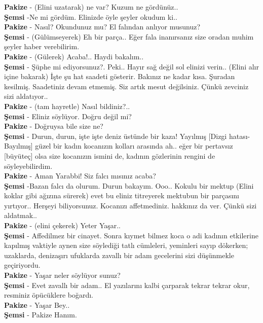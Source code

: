 \documentclass[]{book}
\begin{document}
\textbf{Pakize} - (Elini uzatarak) ne var? Kuzum ne gördünüz..\\
\textbf{Şemsi} -Ne mi gördüm. Elinizde öyle şeyler okudum ki..\\
\textbf{Pakize} - Nasıl? Okundunuz mu? El falından anlıyor musunuz?\\
\textbf{Şemsi} - (Gülümseyerek) Eh bir parça.. Eğer fala inanırsanız size oradan muhim şeyler haber verebilirim.\\
\textbf{Pakize} - (Gülerek) Acaba!.. Haydi bakalım..\\
\textbf{Şemsi} - Şüphe mi ediyorsunuz?. Peki.. Hayır sağ değil sol elinizi verin.. (Elini alır içine bakarak) İşte şu hat saadeti gösterir. Bakınız ne kadar kısa. Şuradan kesilmiş. Saadetiniz devam etmemiş. Siz artık mesut değilsiniz. Çünkü zevciniz sizi aldatıyor..\\
\textbf{Pakize} - (tam hayretle) Nasıl bildiniz?..\\
\textbf{Şemsi} - Eliniz söylüyor. Doğru değil mi?\\
\textbf{Pakize} - Doğruysa bile size ne?\\
\textbf{Şemsi} - Durun, durun, işte işte deniz üstünde bir kaza! Yayılmış {[}Dizgi hatası-Bayılmış{]} güzel bir kadın kocanızın kolları arasında ah.. eğer bir pertavsız {[}büyüteç{]} olsa size kocanızın ismini de, kadının gözlerinin rengini de söyleyebilirdim.\\
\textbf{Pakize} - Aman Yarabbi! Siz falcı mısınız acaba?\\
\textbf{Şemsi} -Bazan falcı da olurum. Durun bakayım. Ooo.. Kokulu bir mektup (Elini koklar gibi ağızına sürerek) evet bu eliniz titreyerek mektubun bir parçasını yırtıyor.. Herşeyi biliyorsunuz. Kocanızı affetmediniz. hakkınız da ver. Çünkü sizi aldatmak..\\
\textbf{Pakize} - (elini çekerek) Yeter Yaşar..\\
\textbf{Şemsi} - Affedilmez bir cinayet. Sonra kıymet bilmez koca o adi kadının etkilerine kapılmış vaktiyle aynen size söylediği tatlı cümleleri, yeminleri sayıp dökerken; uzaklarda, denizaşırı ufuklarda zavallı bir adam gecelerini sizi düşünmekle geçiriyordu.\\
\textbf{Pakize} - Yaşar neler söylüyor sunuz?\\
\textbf{Şemsi} - Evet zavallı bir adam.. El yazılarını kalbi çarparak tekrar tekrar okur, resminiz öpücüklere boğardı.\\
\textbf{Pakize} - Yaşar Bey..\\
\textbf{Şemsi} - Pakize Hanım.\\
\end{document}
